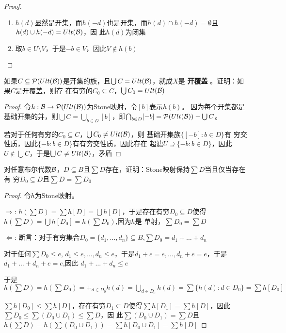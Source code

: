 \documentclass[11pt]{article}
\begin{document}
\begin{proof}
\begin{enumerate}
\item \(h(d)\)显然是开集，而\(h(-d)\)也是开集，而\(h(d)\cap h(-d)=\emptyset\)且\(h(d)\cup h(-d)=Ult(\mathcal{B})\)，因
此\(h(d)\)为闭集

\item 取\(b\in U\setminus V\)，于是\(-b\in V\)，因此\(V\notin h(b)\)
\end{enumerate}
\end{proof}

\begin{exercise}
如果\(C\subseteq\mathcal{P}(Ult(\mathcal{B}))\)是开集的族，且\(\bigcup C=Ult(\mathcal{B})\)，就成\(X\)是 \textbf{开覆盖} 。证明：如果\(C\)是开覆盖，则存
在有穷的\(C_0\subseteq C\)，\(\bigcup C_0=Ult(\mathcal{B})\)
\end{exercise}

\begin{proof}
令\(h:\mathcal{B}\to\mathcal{P}(Ult(\mathcal{B}))\)为Stone映射，令\([b]\)表示\(h(b)\)。
因为每个开集都是基础开集的并，则\(\bigcup C=\bigcup_{b\in D}[b]\)，即\(\bigcap_{b\in D}[-b]=\mathcal{P}(Ult(\mathcal{B}))-\bigcup C\)。

若对于任何有穷的\(C_0\subseteq C\)，\(\bigcup C_0\neq Ult(\mathcal{B})\)，则
基础开集族\(\{[-b]:b\in D\}\)有
穷交性质，因此\(\{-b:b\in D\}\)有有穷交性质，因此存在
超滤\(U\supseteq\{-b:b\in D\}\)，因此\(U\notin\bigcup C\)，于是\(\bigcup C\neq Ult(\mathcal{B})\)，矛盾
\end{proof}

\begin{exercise}
对任意布尔代数\(\mathcal{B}\)，\(D\subseteq B\)且\(\sum D\)存在，证明：Stone映射保持\(\sum D\)当且仅当存在有
穷\(D_0\subseteq D\)且\(\sum D=\sum D_0\)
\end{exercise}

\begin{proof}
令\(h\)为Stone映射。

\(\Rightarrow\): \(h(\sum D)=\sum h[D]=\bigcup h[D]\)，于是存在有穷\(D_0\subseteq D\)使得\(h(\sum D)=\bigcup h[D_0]=h(\sum D_0)\),因为\(h\)是
单射，\(\sum D_0=\sum D\)

\(\Leftarrow\): 断言：对于有穷集合\(D_0=\{d_1,\dots,d_n\}\subseteq B\),\(\sum D_0=d_1+\dots+d_n\)

对于任何\(\sum D_0\le e\), \(d_1\le e,\dots,d_n\le e\)，于是\(d_1+e=e,\dots,d_n+e=e\)，于是\(d_1+\dots+d_n+e=e\),因此
\(d_1+\dots+d_n\le e\)

于是\(h(\sum D)=h(\sum D_0)=+_{d\in D_0}h(d)=\bigcup_{d\in D_0}h(d)=\sum \{h(d):d\in D_0\}=\sum h[D_0]\)

\(\sum h[D_0]\le\sum h[D]\)，存在有穷\(D_1\subseteq D\)使得\(\sum h[D_1]=\sum h[D]\)，因此\(\sum D_0\le\sum(D_0\cup D_1)\le\sum D\)，因
此\(\sum(D_0\cup D_1)=\sum D\)且\(h(\sum D)=h(\sum (D_0\cup D_1))=\sum h[D_0\cup D_1]=\sum h[D]\)
\end{proof}
\end{document}
